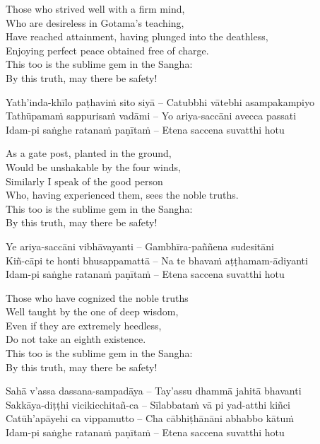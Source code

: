 \begin{english-verses}
  Those who strived well with a firm mind,\\
  Who are desireless in Gotama's teaching,\\
  Have reached attainment, having plunged into the deathless,\\
  Enjoying perfect peace obtained free of charge.\\
  This too is the sublime gem in the Sangha:\\
  By this truth, may there be safety!
\end{english-verses}

Yath'inda-khīlo paṭhaviṁ sito siyā – Catubbhi vātebhi asampakampiyo\\
Tathūpamaṁ sappurisaṁ vadāmi – Yo ariya-saccāni avecca passati\\
Idam-pi saṅghe ratanaṁ paṇītaṁ – Etena saccena suvatthi hotu

\begin{english-verses}
  As a gate post, planted in the ground,\\
  Would be unshakable by the four winds,\\
  Similarly I speak of the good person\\
  Who, having experienced them, sees the noble truths.\\
  This too is the sublime gem in the Sangha:\\
  By this truth, may there be safety!
\end{english-verses}

Ye ariya-saccāni vibhāvayanti – Gambhīra-paññena sudesitāni\\
Kiñ-cāpi te honti bhusappamattā – Na te bhavaṁ aṭṭhamam-ādiyanti\\
Idam-pi saṅghe ratanaṁ paṇītaṁ – Etena saccena suvatthi hotu

\begin{english-verses}
  Those who have cognized the noble truths\\
  Well taught by the one of deep wisdom,\\
  Even if they are extremely heedless,\\
  Do not take an eighth existence.\\
  This too is the sublime gem in the Sangha:\\
  By this truth, may there be safety!
\end{english-verses}

Sahā v'assa dassana-sampadāya – Tay'assu dhammā jahitā bhavanti\\
Sakkāya-diṭṭhi vicikicchitañ-ca – Sīlabbataṁ vā pi yad-atthi kiñci\\
Catūh'apāyehi ca vippamutto – Cha cābhiṭhānāni abhabbo kātuṁ\\
Idam-pi saṅghe ratanaṁ paṇītaṁ – Etena saccena suvatthi hotu

